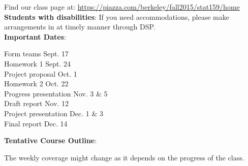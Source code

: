 \documentclass[11pt]{article}
\begin{document}
Find our class page at: \url{https://piazza.com/berkeley/fall2015/stat159/home}\\

\textbf{Students with disabilities}: If you need accommodations, please make
arrangements in at timely manner through DSP.\\

\noindent\textbf{Important Dates}:
\begin{center} \begin{minipage}{5in}
\begin{flushleft}
Form teams \dotfill Sept. 17\\
Homework 1 \dotfill Sept. 24\\
Project proposal \dotfill Oct. 1\\
Homework 2 \dotfill Oct. 22\\
Progress presentation \dotfill Nov. 3 \& 5\\
Draft report \dotfill Nov. 12\\
Project presentation \dotfill Dec. 1 \& 3\\
Final report \dotfill Dec. 14\\
\end{flushleft}
\end{minipage}
\end{center}

\newpage

\textbf {\large Tentative Course Outline}:

The weekly coverage might change as it depends on the progress of the class.
\end{document}
